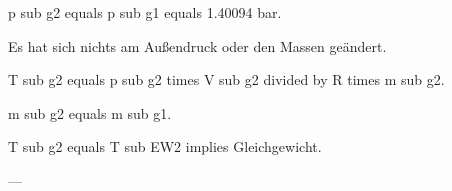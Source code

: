 p sub g2 equals p sub g1 equals 1.40094 bar.  

Es hat sich nichts am Außendruck oder den Massen geändert.  

T sub g2 equals p sub g2 times V sub g2 divided by R times m sub g2.  

m sub g2 equals m sub g1.  

T sub g2 equals T sub EW2 implies Gleichgewicht.  

---